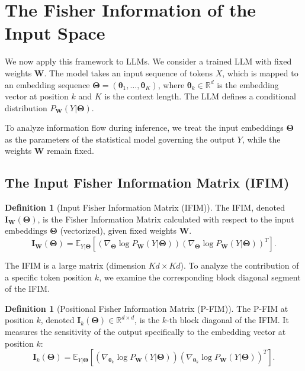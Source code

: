 \documentclass{article}
\theoremstyle{definition}
\newtheorem{definition}[theorem]{Definition}
\begin{document}
\section{The Fisher Information of the Input Space}
We now apply this framework to LLMs. We consider a trained LLM with fixed weights $\mathbf{W}$. The model takes an input sequence of tokens $X$, which is mapped to an embedding sequence $\mathbf{\Theta} = (\boldsymbol{\theta}_1, \dots, \boldsymbol{\theta}_K)$, where $\boldsymbol{\theta}_k \in \mathbb{R}^d$ is the embedding vector at position $k$ and $K$ is the context length. The LLM defines a conditional distribution $P_{\mathbf{W}}(Y|\mathbf{\Theta})$.

To analyze information flow during inference, we treat the input embeddings $\mathbf{\Theta}$ as the parameters of the statistical model governing the output $Y$, while the weights $\mathbf{W}$ remain fixed.

\subsection{The Input Fisher Information Matrix (IFIM)}

\begin{definition}[Input Fisher Information Matrix (IFIM)]
The IFIM, denoted $\mathbf{I}_{\mathbf{W}}(\mathbf{\Theta})$, is the Fisher Information Matrix calculated with respect to the input embeddings $\mathbf{\Theta}$ (vectorized), given fixed weights $\mathbf{W}$.
\begin{equation}
    \mathbf{I}_{\mathbf{W}}(\mathbf{\Theta}) = \mathbb{E}_{Y|\mathbf{\Theta}} \left[ \left(\nabla_{\mathbf{\Theta}} \log P_{\mathbf{W}}(Y|\mathbf{\Theta})\right) \left(\nabla_{\mathbf{\Theta}} \log P_{\mathbf{W}}(Y|\mathbf{\Theta})\right)^T \right].
\end{equation}
\end{definition}

The IFIM is a large matrix (dimension $Kd \times Kd$). To analyze the contribution of a specific token position $k$, we examine the corresponding block diagonal segment of the IFIM.

\begin{definition}[Positional Fisher Information Matrix (P-FIM)]
The P-FIM at position $k$, denoted $\mathbf{I}_k(\mathbf{\Theta}) \in \mathbb{R}^{d \times d}$, is the $k$-th block diagonal of the IFIM. It measures the sensitivity of the output specifically to the embedding vector at position $k$:
\begin{equation}
    \mathbf{I}_k(\mathbf{\Theta}) = \mathbb{E}_{Y|\mathbf{\Theta}} \left[ \left(\nabla_{\boldsymbol{\theta}_k} \log P_{\mathbf{W}}(Y|\mathbf{\Theta})\right) \left(\nabla_{\boldsymbol{\theta}_k} \log P_{\mathbf{W}}(Y|\mathbf{\Theta})\right)^T \right].
\end{equation}
\end{definition}
\end{document}
